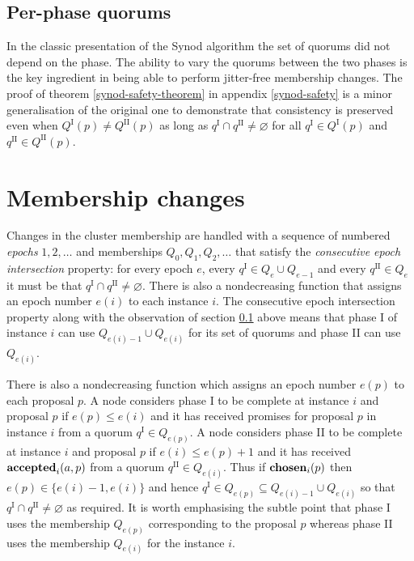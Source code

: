 \documentclass[journal]{IEEEtran}
\begin{document}
\subsection{Per-phase quorums}\label{per-phase-quorums}

In the classic presentation of the Synod algorithm the set of quorums did not
depend on the phase. The ability to vary the quorums between the two phases is
the key ingredient in being able to perform jitter-free membership changes. The
proof of theorem \ref{synod-safety-theorem} in appendix \ref{synod-safety} is a
minor generalisation of the original one to demonstrate that consistency is
preserved even when $Q^\textrm{I}(p) \ne Q^\textrm{II}(p)$ as long as
$q^\textrm{I} \cap q^\textrm{II} \ne \varnothing$ for all $q^\textrm{I} \in
Q^\textrm{I}(p)$ and $q^\textrm{II} \in Q^\textrm{II}(p)$.

\section{Membership changes}\label{membership-changes}

Changes in the cluster membership are handled with a sequence of numbered
\textit{epochs} $1, 2, \ldots$ and memberships $Q_0, Q_1, Q_2, \ldots$ that
satisfy the \textit{consecutive epoch intersection} property: for every epoch
$e$, every $q^\textrm{I} \in Q_{e} \cup Q_{e-1}$ and every $q^\textrm{II} \in
Q_{e}$ it must be that $q^\textrm{I} \cap q^\textrm{II} \ne \varnothing$.
There is also a nondecreasing function that assigns an epoch number $e(i)$ to
each instance $i$.  The consecutive epoch intersection property along with the
observation of section \ref{per-phase-quorums} above means that phase I of
instance $i$ can use $Q_{e(i)-1} \cup Q_{e(i)}$ for its set of quorums and
phase II can use $Q_{e(i)}$.

There is also a nondecreasing function which assigns an epoch number $e(p)$ to
each proposal $p$. A node considers phase I to be complete at instance $i$ and
proposal $p$ if $e(p) \le e(i)$ and it has received promises for proposal $p$
in instance $i$ from a quorum $q^\textrm{I} \in Q_{e(p)}$. A node considers
phase II to be complete at instance $i$ and proposal $p$ if $e(i) \le e(p)+1$
and it has received $\mathbf{accepted}_{i}(a,p)$ from a quorum $q^\textrm{II} \in Q_{e(i)}$.
Thus if $\mathbf{chosen}_{i}(p)$ then $e(p) \in \{ e(i)-1, e(i) \}$ and hence
$q^\textrm{I} \in Q_{e(p)} \subseteq Q_{e(i)-1} \cup Q_{e(i)}$ so that
$q^\textrm{I} \cap q^\textrm{II} \ne \varnothing$ as required. It is worth
emphasising the subtle point that phase I uses the membership $Q_{e(p)}$
corresponding to the proposal $p$ whereas phase II uses the membership
$Q_{e(i)}$ for the instance $i$.
\end{document}
